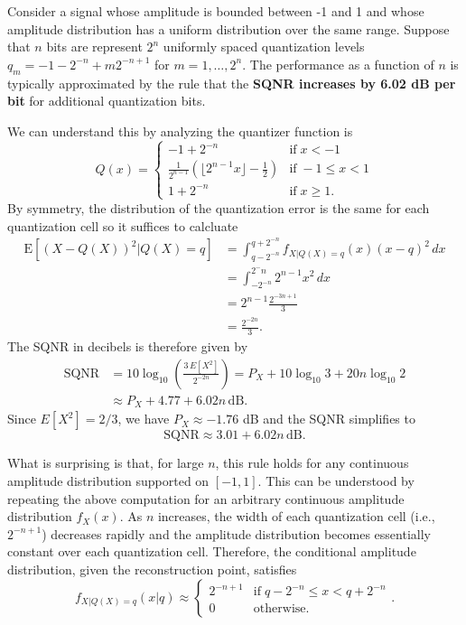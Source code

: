 \begin{example}
Consider a signal whose amplitude is bounded between -1 and 1 and whose amplitude distribution has a uniform distribution over the same range.
Suppose that $n$ bits are represent $2^n$ uniformly spaced quantization levels $q_m = -1-2^{-n} + m 2^{-n+1}$ for $m=1,\ldots,2^n$.
The performance as a function of $n$ is typically approximated by the rule that the \textbf{SQNR increases by 6.02 dB per bit} for additional quantization bits.

We can understand this by analyzing the quantizer function is
\[ Q(x) =
\begin{cases}
-1+2^{-n} & \mathrm{if} \; x < -1 \\
\frac{1}{2^{n-1}} \left( \lfloor 2^{n-1} x \rfloor - \frac{1}{2} \right) & \mathrm{if} \; - 1 \leq x < 1 \\
1+2^{-n} & \mathrm{if} \; x \geq 1.
\end{cases}
\]
By symmetry, the distribution of the quantization error is the same for each quantization cell so it suffices to calcluate
\begin{align*}
\mathrm{E} \left[ \left( X - Q(X) \right)^2 \big| Q(X)=q \right]
&= \int_{q-2^{-n}}^{q+2^{-n}} f_{X|Q(X)=q} (x) (x-q)^2 \, dx \\
&= \int_{-2^{-n}}^{2^-n} 2^{n-1} x^2 \, dx \\
&= 2^{n-1} \frac{2^{-3n+1}}{3} \\
&= \frac{2^{-2n}}{3}.
\end{align*}
The SQNR in decibels is therefore given by
\begin{align*}
\text{SQNR} &= 10 \log_{10} \left( \frac{3\,E[X^2]}{2^{-2n}} \right)
= P_X + 10 \log_{10} 3 + 20n \log_{10} 2 \\
& \approx P_X + 4.77 + 6.02 n \, \text{dB}.
\end{align*}
Since $E[X^2] = 2/3$, we have $P_X \approx -1.76$ dB and the SQNR simplifies to
\[ \text{SQNR} \approx 3.01 + 6.02 n \, \text{dB}. \]
\end{example}

What is surprising is that, for large $n$, this rule holds for any continuous amplitude distribution supported on $[-1,1]$.
This can be understood by repeating the above computation for an arbitrary continuous amplitude distribution $f_X (x)$.
As $n$ increases, the width of each quantization cell (i.e., $2^{-n+1}$) decreases rapidly and the amplitude distribution becomes essentially constant over each quantization cell.
Therefore, the conditional amplitude distribution, given the reconstruction point, satisfies
\[ f_{X|Q(X)=q} (x|q) \approx \begin{cases} 2^{-n+1} & \mathrm{if}\; q-2^{-n} \leq x < q+2^{-n} \\ 0 & \mathrm{otherwise.} \end{cases}. \]

